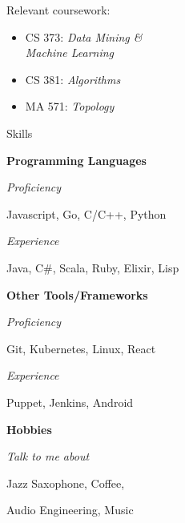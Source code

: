 \begin{minipage}[t]{0.305\textwidth}
\begin{adjustwidth}{10pt}{}

    Relevant coursework:
    \begin{itemize}[leftmargin=*]
    \item CS 373: \emph{Data Mining \&}\\\phantom{CS 373: }\emph{Machine Learning}
    \item CS 381: \emph{Algorithms}
    \item MA 571: \emph{Topology}
    \end{itemize}
  \end{adjustwidth}

  \vspace{10pt}

  {\sectionfont Skills}

  \vspace{5pt}
  \textbf{Programming Languages}
  \vspace{2pt}
  \begin{adjustwidth}{10pt}{}
    \emph{Proficiency}

    \quad Javascript, Go, C/C++, Python

    \emph{Experience}

    \quad Java, C\#, Scala, Ruby, Elixir, Lisp

  \end{adjustwidth}

  \vspace{5pt}
  \textbf{Other Tools/Frameworks}
  \vspace{2pt}
  \begin{adjustwidth}{10pt}{}
    \emph{Proficiency}

    \quad Git, Kubernetes, Linux, React

    \emph{Experience}

    \quad Puppet, Jenkins, Android
  \end{adjustwidth}

  \vspace{5pt}
  \textbf{Hobbies}
  \vspace{2pt}
  \begin{adjustwidth}{10pt}{}
    \emph{Talk to me about}

    \quad Jazz Saxophone, Coffee,

    \quad Audio Engineering, Music
  \end{adjustwidth}

  \vspace{20pt}


\end{minipage}
